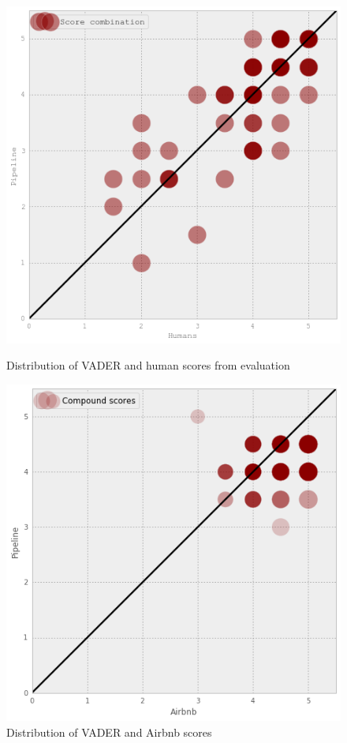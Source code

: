 \begin{figure}
\begin{minipage}{7cm}
\center
	\includegraphics[height=0.32\textheight]{vaderhumans}
	\centering \caption{ Distribution of VADER and human scores from evaluation}
	\label{fig:6.7}
\end{minipage}
\hspace{2cm}
\begin{minipage}{7cm}
\centering
    \includegraphics[height=0.32\textheight]{pipelineairbnb}
	\caption{Distribution of VADER and Airbnb scores}
	\label{fig:6.8}
\end{minipage}
\end{figure}